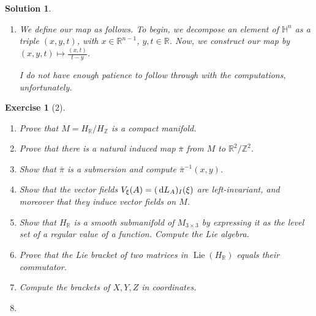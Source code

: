 \documentclass{article}
\theoremstyle{plain}
\newtheorem*{ex}{Exercise}
\theoremstyle{nonumberplain}
\newtheorem{sol}{Solution}
\newcommand{\R}{\mathbb{R}}
\newcommand{\Z}{\mathbb{Z}}
\newcommand{\HH}{\mathbb{H}}
\DeclareMathOperator{\Lie}{Lie}
\begin{document}
\begin{sol}
\begin{enumerate}
\item We define our map as follows. To begin, we decompose an element of $\HH^n$ as a triple $(x,y,t)$, with $x \in \R^{n-1}$, $y, t \in \R$. Now, we construct our map by $(x,y,t) \mapsto \frac{(x,t)}{t - y}$.

I do not have enough patience to follow through with the computations, unfortunately.
\end{enumerate}
\end{sol}

\begin{ex}[2]
\leavevmode
\begin{enumerate}
\item Prove that $M = H_\R /H_\Z$ is a compact manifold.
\item Prove that there is a natural induced map $\bar \pi$ from $M$ to $\R^2 / \Z^2$.
\item Show that $\bar \pi$ is a submersion and compute $\bar \pi^{-1}(x,y)$.
\item Show that the vector fields $V_\xi(A) = (\dl L_A)_I(\xi)$ are left-invariant, and moreover that they induce vector fields on $M$.
\item Show that $H_\R$ is a smooth submanifold of $M_{3 \times 3}$ by expressing it as the level set of a regular value of a function. Compute the Lie algebra.
\item Prove that the Lie bracket of two matrices in $\Lie(H_\R)$ equals their commutator.
\item Compute the brackets of $X,Y,Z$ in coordinates.
\item
\end{enumerate}
\end{ex}
\end{document}
